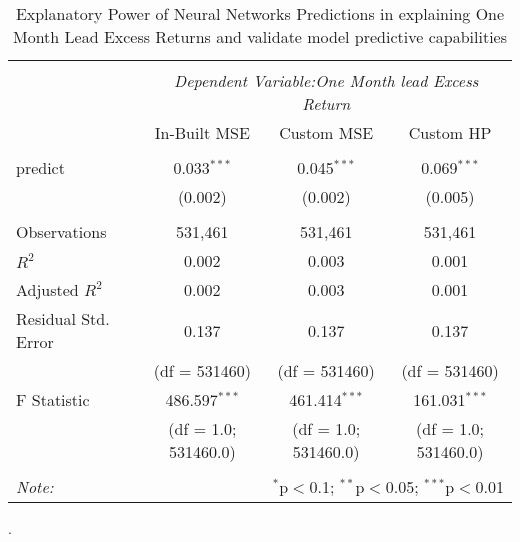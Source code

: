 \begin{table}[H] \centering
\begin{tabular}{@{\extracolsep{5pt}}lccc}
\\[-1.8ex]\hline
\hline \\[-1.8ex]
& \multicolumn{3}{c}{\textit{Dependent Variable:One Month lead Excess Return}} \
\cr \cline{3-4}
\\[-1.8ex] & In-Built MSE & Custom MSE & Custom HP \\
\hline \\[-1.8ex]
 predict & 0.033$^{***}$ & 0.045$^{***}$ & 0.069$^{***}$ \\
  & (0.002) & (0.002) & (0.005) \\
\hline \\[-1.8ex]
 Observations & 531,461 & 531,461 & 531,461 \\
 $R^2$ & 0.002 & 0.003 & 0.001 \\
 Adjusted $R^2$ & 0.002 & 0.003 & 0.001 \\
 Residual Std. Error & 0.137 & 0.137 & 0.137  \\
                    &(df = 531460) & (df = 531460) &  (df = 531460)\\
 F Statistic & 486.597$^{***}$ & 461.414$^{***}$ & 161.031$^{***}$ \\
  & (df = 1.0; 531460.0) & (df = 1.0; 531460.0) & (df = 1.0; 531460.0) \\
\hline
\hline \\[-1.8ex]
\textit{Note: } & \multicolumn{3}{r}{$^{*}$p$<$0.1; $^{**}$p$<$0.05; $^{***}$p$<$0.01} \\
\end{tabular}
\caption{Explanatory Power of Neural Networks Predictions in explaining One Month Lead Excess Returns and validate model predictive capabilities}.
\label{test-model-predict}
\end{table}
